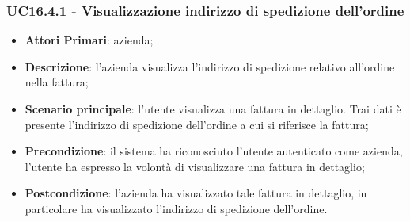 \subsubsection{UC16.4.1 - Visualizzazione indirizzo di spedizione dell'ordine}
\begin{itemize}
	\item \textbf{Attori Primari}: azienda;
	\item \textbf{Descrizione}: l'azienda visualizza l'indirizzo di spedizione relativo all'ordine nella fattura;
	\item \textbf{Scenario principale}: l'utente visualizza una fattura in dettaglio. Trai dati è presente l'indirizzo di spedizione dell'ordine a cui si riferisce la fattura;
	\item \textbf{Precondizione}: il sistema ha riconosciuto l'utente autenticato come azienda, l'utente ha espresso la volontà di visualizzare una fattura in dettaglio;
	\item \textbf{Postcondizione}: l'azienda ha visualizzato tale fattura in dettaglio, in particolare ha visualizzato l'indirizzo di spedizione dell'ordine.
\end{itemize} 
